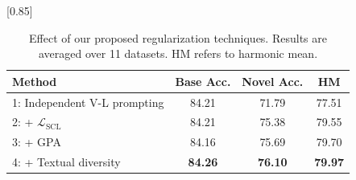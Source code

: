 \begin{table}[!t]

    \small \centering
 \setlength{\tabcolsep}{8pt}
    \scalebox{0.85}[0.85]{
    \begin{tabular}{l cc | c }
    \toprule
    Method  & Base Acc. & Novel Acc. & HM\\
    \midrule
    1: Independent V-L prompting & 84.21 & 71.79 & 77.51 \\
    2: + $\mathcal{L}_\text{SCL}$ & 84.21 & 75.38 & 79.55 \\
    3: + GPA & 84.16	& 75.69	& 79.70 \\
    \rowcolor{tabhighlight}
    4: + Textual diversity & \textbf{84.26} & \textbf{76.10} & \textbf{79.97} \\
    \bottomrule
    \end{tabular}
    }\vspace{-0.5em}
    \caption{Effect of our proposed regularization techniques. Results are averaged over 11 datasets. HM refers to harmonic mean. 
    }
    \label{tab:ablations_on_components}
\end{table}